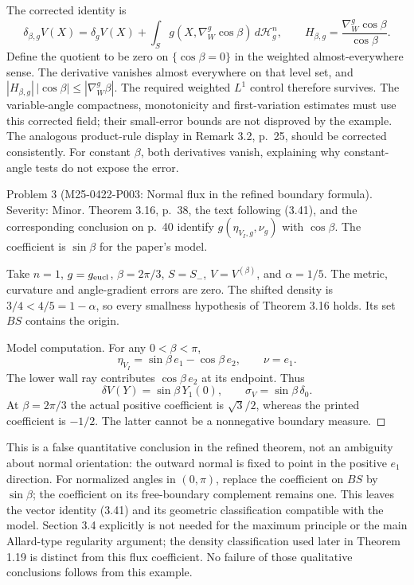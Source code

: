 \documentclass[10pt]{article}
\begin{document}
The corrected identity is \[\delta_{\beta,g}V(X)=\delta_gV(X)
       +\int_S g(X,\nabla_W^g\cos\beta)\,d\mathcal H_g^n,\qquad
 H_{\beta,g}=\frac{\nabla_W^g\cos\beta}{\cos\beta}.\] Define the quotient to be zero on \(\{\cos\beta=0\}\) in the weighted almost-everywhere sense. The derivative vanishes almost everywhere on that level set, and \(|H_{\beta,g}|\,|\cos\beta|\leq|\nabla_W^g\beta|\). The required weighted \(L^1\) control therefore survives. The variable-angle compactness, monotonicity and first-variation estimates must use this corrected field; their small-error bounds are not disproved by the example. The analogous product-rule display in Remark 3.2, p. 25, should be corrected consistently. For constant \(\beta\), both derivatives vanish, explaining why constant-angle tests do not expose the error.\par
Problem 3 (M25-0422-P003: Normal flux in the refined boundary formula).  Severity: Minor. Theorem 3.16, p. 38, the text following (3.41), and the corresponding conclusion on p. 40 identify \(g(\eta_{V_I,g},\nu_g)\) with \(\cos\beta\). The coefficient is \(\sin\beta\) for the paper’s model.\par
Take \(n=1\), \(g=g_{\rm eucl}\), \(\beta=2\pi/3\), \(S=S_-\), \(V=V^{(\beta)}\), and \(\alpha=1/5\). The metric, curvature and angle-gradient errors are zero. The shifted density is \(3/4<4/5=1-\alpha\), so every smallness hypothesis of Theorem 3.16 holds. Its set \(BS\) contains the origin.\par
Model computation. For any \(0<\beta<\pi\), \[\eta_{V_I}=\sin\beta\,e_1-\cos\beta\,e_2,\qquad \nu=e_1.\] The lower wall ray contributes \(\cos\beta\,e_2\) at its endpoint. Thus \[\delta V(Y)=\sin\beta\,Y_1(0),\qquad
 \sigma_V=\sin\beta\,\delta_0 .\] At \(\beta=2\pi/3\) the actual positive coefficient is \(\sqrt3/2\), whereas the printed coefficient is \(-1/2\). The latter cannot be a nonnegative boundary measure. ◻\par
This is a false quantitative conclusion in the refined theorem, not an ambiguity about normal orientation: the outward normal is fixed to point in the positive \(e_1\) direction. For normalized angles in \((0,\pi)\), replace the coefficient on \(BS\) by \(\sin\beta\); the coefficient on its free-boundary complement remains one. This leaves the vector identity (3.41) and its geometric classification compatible with the model. Section 3.4 explicitly is not needed for the maximum principle or the main Allard-type regularity argument; the density classification used later in Theorem 1.19 is distinct from this flux coefficient. No failure of those qualitative conclusions follows from this example.\par
\end{document}
